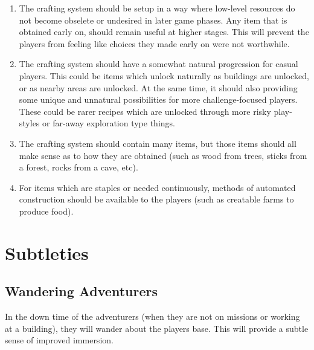 \begin{enumerate}[itemsep=0pt]
	\item The crafting system should be setup in a way where low-level resources do not become obselete or undesired in later game phases. Any item that is obtained early on, should remain useful at higher stages. This will prevent the players from feeling like choices they made early on were not worthwhile.
	\item The crafting system should have a somewhat natural progression for casual players. This could be items which unlock naturally as buildings are unlocked, or as nearby areas are unlocked. At the same time, it should also providing some unique and unnatural possibilities for more challenge-focused players. These could be rarer recipes which are unlocked through more risky play-styles or far-away exploration type things.
	\item The crafting system should contain many items, but those items should all make sense as to how they are obtained (such as wood from trees, sticks from a forest, rocks from a cave, etc).
	\item For items which are staples or needed continuously, methods of automated construction should be available to the players (such as creatable farms to produce food).
\end{enumerate}





\section{Subtleties}

\subsection{Wandering Adventurers}

In the down time of the adventurers (when they are not on missions or working at a building), they will wander about the players base. This will provide a subtle sense of improved immersion. 

